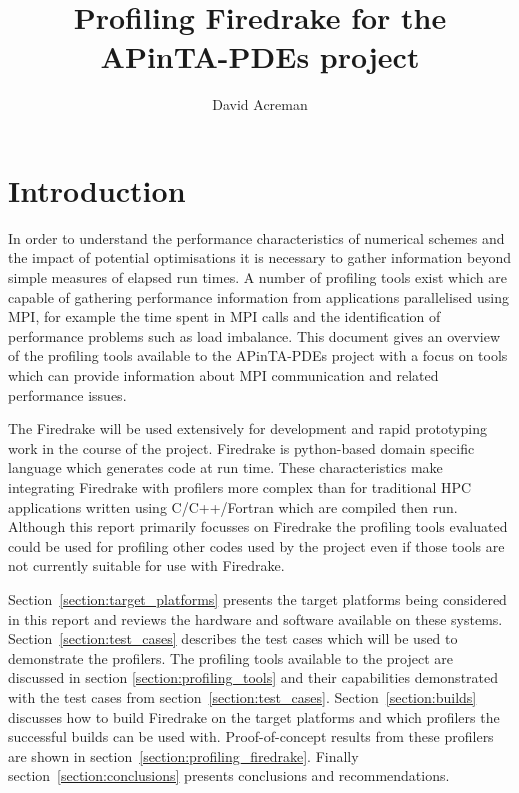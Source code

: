 \documentclass[a4paper,titlepage]{article}
\author{David Acreman}
\title{Profiling Firedrake for the APinTA-PDEs project}
\begin{document}
\pagestyle{fancy}
\lhead{}
\chead{}

\maketitle
\pagebreak
\tableofcontents
\pagebreak


\section{Introduction}

In order to understand the performance characteristics of numerical schemes and the impact of potential optimisations it is necessary to gather information beyond simple measures of elapsed run times. A number of profiling tools exist which are capable of gathering performance information from applications parallelised using MPI, for example the time spent in MPI calls and the identification of performance problems such as load imbalance. This document gives an overview of the profiling tools available to the APinTA-PDEs project with a focus on tools which can provide information about MPI communication and related performance issues. 

The Firedrake will be used extensively for development and rapid prototyping work in the course of the project. Firedrake is python-based domain specific language which generates code at run time. These characteristics make integrating Firedrake with profilers more complex than for traditional HPC applications written using C/C++/Fortran which are compiled then run. Although this report primarily focusses on Firedrake the profiling tools evaluated could be used for profiling other codes used by the project even if those tools are not currently suitable for use with Firedrake.

Section~\ref{section:target_platforms} presents the target platforms being considered in this report and reviews the hardware and software available on these systems. Section~\ref{section:test_cases} describes the test cases which will be used to demonstrate the profilers. The profiling tools available to the project are discussed in section \ref{section:profiling_tools} and their capabilities demonstrated with the test cases from section~\ref{section:test_cases}. Section~\ref{section:builds} discusses how to build Firedrake on the target platforms and which profilers the successful builds can be used with. Proof-of-concept results from these profilers are shown in section~\ref{section:profiling_firedrake}. Finally section~\ref{section:conclusions} presents conclusions and recommendations. 
\end{document}
